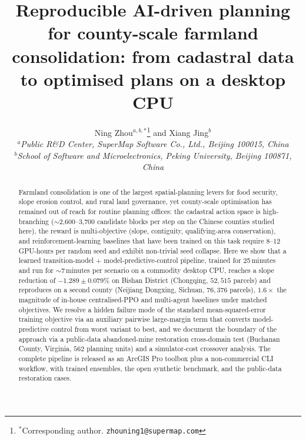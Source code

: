 \documentclass[11pt]{article}
\begin{document}
\title{Reproducible AI-driven planning for county-scale farmland consolidation: from cadastral data to optimised plans on a desktop CPU}

\author{Ning Zhou$^{a,b,\ast}$\thanks{$^\ast$Corresponding author. \texttt{zhouning1@supermap.com}} and Xiang Jing$^{b}$\\
$^{a}${\em Public R\&D Center, SuperMap Software Co., Ltd., Beijing 100015, China}\\
$^{b}${\em School of Software and Microelectronics, Peking University, Beijing 100871, China}}

\date{}
\maketitle
\sloppy  %

\begin{abstract}
Farmland consolidation is one of the largest spatial-planning levers for food security, slope erosion control, and rural land governance, yet county-scale optimisation has remained out of reach for routine planning offices: the cadastral action space is high-branching ($\sim$2{,}600--3{,}700 candidate blocks per step on the Chinese counties studied here), the reward is multi-objective (slope, contiguity, qualifying-area conservation), and reinforcement-learning baselines that have been trained on this task require $8$--$12$ GPU-hours per random seed and exhibit non-trivial seed collapse. Here we show that a learned transition-model + model-predictive-control pipeline, trained for 25\,minutes and run for $\sim$7\,minutes per scenario on a commodity desktop CPU, reaches a slope reduction of $-1.289 \pm 0.079\%$ on Bishan District (Chongqing, $52{,}515$ parcels) and reproduces on a second county (Neijiang Dongxing, Sichuan, $76{,}376$ parcels), $1.6\times$ the magnitude of in-house centralised-PPO and multi-agent baselines under matched objectives. We resolve a hidden failure mode of the standard mean-squared-error training objective via an auxiliary pairwise large-margin term that converts model-predictive control from worst variant to best, and we document the boundary of the approach via a public-data abandoned-mine restoration cross-domain test (Buchanan County, Virginia, $562$ planning units) and a simulator-cost crossover analysis. The complete pipeline is released as an ArcGIS Pro toolbox plus a non-commercial CLI workflow, with trained ensembles, the open synthetic benchmark, and the public-data restoration cases.
\end{abstract}
\end{document}
